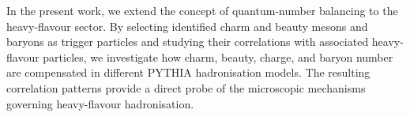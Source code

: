 In the present work, we extend the concept of quantum-number balancing to the heavy-flavour sector. By selecting identified charm and beauty mesons and baryons as trigger particles and studying their correlations with associated heavy-flavour particles, we investigate how charm, beauty, charge, and baryon number are compensated in different PYTHIA hadronisation models. The resulting correlation patterns provide a direct probe of the microscopic mechanisms governing heavy-flavour hadronisation.